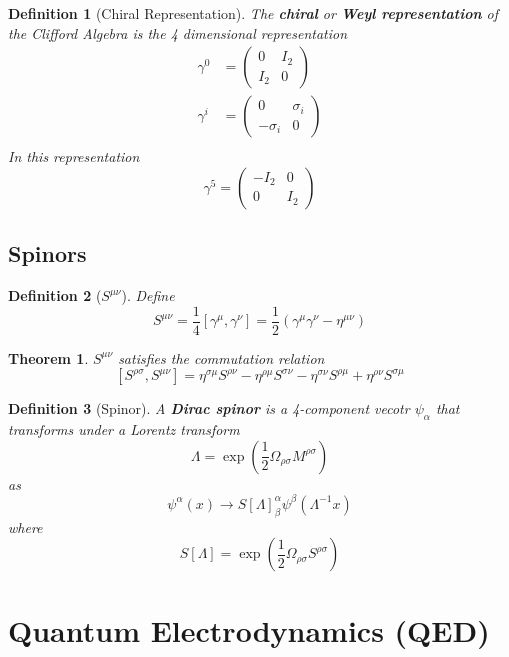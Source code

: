 \documentclass{article}
\newtheorem{theorem}{Theorem}[subsection]
\newtheorem{definition}{Definition}[subsection]
\newcommand{\bam}[1]{\textbf{#1}}
\newcommand{\comm}[2][]{\left[ #1, #2 \right]} %
\begin{document}
\begin{definition}[Chiral Representation]
The \bam{chiral} or \bam{Weyl representation} of the Clifford Algebra is the 4 dimensional representation
\begin{align*}
    \gamma^0 &= \begin{pmatrix} 0 & I_2 \\ I_2 & 0 \end{pmatrix} \\
    \gamma^i &= \begin{pmatrix} 0 & \sigma_i \\ -\sigma_i & 0 \end{pmatrix} \\ 
\end{align*}
In this representation 
\[
\gamma^5=\begin{pmatrix} -I_2 & 0 \\ 0 & I_2 \end{pmatrix}
\]
\end{definition}

\subsection{Spinors}

\begin{definition}[$S^{\mu\nu}$]
Define
\[
S^{\mu\nu}=\frac{1}{4}\comm[\gamma^\mu]{\gamma^\nu}=\frac{1}{2}\left( \gamma^\mu \gamma^\nu -\eta^{\mu\nu} \right)
\]
\end{definition}

\begin{theorem}
$S^{\mu\nu}$ satisfies the commutation relation
\[
\comm[S^{\rho\sigma}]{S^{\mu\nu}}=\eta^{\sigma\mu}S^{\rho\nu}-\eta^{\rho\mu}S^{\sigma\nu}-\eta^{\sigma\nu}S^{\rho\mu}+\eta^{\rho\nu}S^{\sigma\mu}
\]
\end{theorem}

\begin{definition}[Spinor]
A \bam{Dirac spinor} is a 4-component vecotr $\psi_\alpha$ that transforms under a Lorentz transform 
\[
\Lambda=\exp\left(\frac{1}{2}\Omega_{\rho\sigma}M^{\rho\sigma}\right)
\]
as 
\[
\psi^{\alpha}(x)\to S[\Lambda]_{\beta}^{\alpha}\psi^{\beta}\left(\Lambda^{-1}x\right)
\]
where
\[
S[\Lambda]=\exp\left(\frac{1}{2}\Omega_{\rho\sigma}S^{\rho\sigma}\right)
\]
\end{definition}
\section{Quantum Electrodynamics (QED)}
\end{document}
